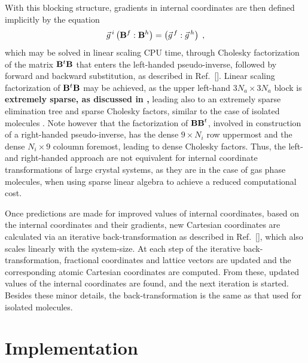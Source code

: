 \twolinestyle{\documentclass[prb,preprint]{revtex4}}
\begin{document}
With this blocking structure, gradients in internal coordinates are then defined implicitly by the equation
\begin{equation}
\vec{g}^{\, i} \left( {\bf B}^f : {\bf B}^h \right)= \left(\vec{g}^{\, f} : \vec{g}^{\, h} \right) \;, 
\end{equation}
which  may be solved in linear scaling CPU time, through Cholesky factorization of the 
matrix ${\bf B}^{t} {\bf B}$ that enters the left-handed pseudo-inverse, 
followed by forward and backward substitution, as described in Ref.~[].  
Linear scaling factorization of ${\bf B}^t \bf B$ may be achieved, as the upper left-hand 
$3 N_a \times 3 N_a$ block is 
{\bf
extremely sparse, as discussed in ,
}
leading also to  
an extremely sparse elimination tree
and sparse Cholesky factors, similar to the case of isolated molecules \cite{KNemeth00B}.
Note however that the factorization of ${\bf B B}^{t}$, involved in construction of a right-handed 
pseudo-inverse, has the dense $9 \times N_i$ row uppermost and the dense $N_i \times 9$ coloumn foremost,
leading to dense Cholesky factors. Thus, the left- and right-handed approach  are not equivalent for 
internal coordinate transformations of large crystal systems, as they are in the case of
gas phase molecules, when using sparse linear algebra to achieve a reduced computational cost.

Once predictions are made for improved values of internal coordinates,
based on the internal coordinates and their gradients, new Cartesian coordinates are 
calculated via an iterative back-transformation as described in Ref.~[], 
which also scales linearly with the system-size. At each step of the iterative back-transformation, 
fractional coordinates 
and lattice vectors are updated and the corresponding atomic Cartesian coordinates are
computed.  From these, updated values of the internal coordinates are found, and
the next iteration is started.  Besides these minor details, the back-transformation
is the same as that used for isolated molecules.

\section{Implementation} \label{implementation}
\end{document}
